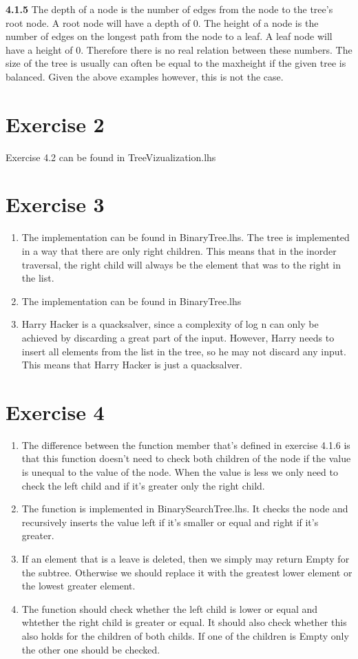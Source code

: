 \documentclass{article}
\begin{document}
\textbf{4.1.5}
The depth of a node is the number of edges from the node to the tree's root node.
A root node will have a depth of 0.
The height of a node is the number of edges on the longest path from the node to a leaf.
A leaf node will have a height of 0. Therefore there is no real relation between these numbers. The size of the tree is usually can often be equal to the maxheight if the given tree is balanced. Given the above examples however, this is not the case.

\section*{Exercise 2}
Exercise 4.2 can be found in TreeVizualization.lhs

\section*{Exercise 3}
\begin{enumerate}
  \item The implementation can be found in BinaryTree.lhs. The tree is implemented in a way that there are only right children. This means that in the inorder traversal, the right child will always be the element that was to the right in the list.
  \item The implementation can be found in BinaryTree.lhs
  \item Harry Hacker is a quacksalver, since a complexity of log n can only be achieved by discarding a great part of the input. However, Harry needs to insert all elements from the list in the tree, so he may not discard any input. This means that Harry Hacker is just a quacksalver.
\end{enumerate}


\section*{Exercise 4}
\begin{enumerate}
  \item The difference between the function member that's defined in exercise 4.1.6 is that this function doesn't need to check both children of the node if the value is unequal to the value of the node. When the value is less we only need to check the left child and if it's greater only the right child.
  \item The function is implemented in BinarySearchTree.lhs. It checks the node and recursively inserts the value left if it's smaller or equal and right if it's greater.
  \item If an element that is a leave is deleted, then we simply may return Empty for the subtree. Otherwise we should replace it with the greatest lower element or the lowest greater element.
  \item The function should check whether the left child is lower or equal and whtether the right child is greater or equal. It should also check whether this also holds for the children of both childs. If one of the children is Empty only the other one should be checked.
\end{enumerate}
\end{document}
